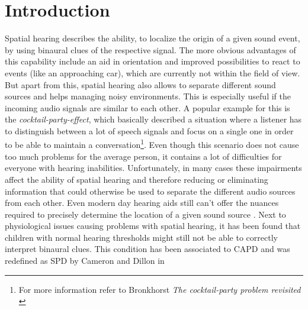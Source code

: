 \documentclass[a4paper,11pt]{article}%
\renewcommand{\\}{\vspace*{0.5\baselineskip} \newline}
\begin{document}
\newpage


\section{Introduction}
\label{sec:introduction}
Spatial hearing describes the ability, to localize the origin of a given sound event, by using binaural clues of the respective signal. The more obvious advantages of this capability include an aid in orientation and improved possibilities to react to events (like an approaching car), which are currently not within the field of view.
\newline
\newline
But apart from this, spatial hearing also allows to separate different sound sources and helps managing noisy environments. This is especially useful if the incoming audio signals are similar to each other. A popular example for this is the \textit{cocktail-party-effect}, which basically described a situation where a listener has to distinguish between a lot of speech signals and focus on a single one in order to be able to maintain a conversation\footnote{For more information refer to Bronkhorst \textit{The cocktail-party problem revisited} \cite{CP}}.
\newline
\newline
Even though this scenario does not cause too much problems for the average person, it contains a lot of difficulties for everyone with hearing inabilities. Unfortunately, in many cases these impairments affect the ability of spatial hearing and therefore reducing or eliminating information that could otherwise be used to separate the different audio sources from each other. Even modern day hearing aids still can't offer the nuances required to precisely determine the location of a given sound source \cite{HA-SRT}.
\newline
\newline
Next to physiological issues causing problems with spatial hearing, it has been found that children with normal hearing thresholds might still not be able to correctly interpret binaural clues. This condition has been associated to \ac{CAPD} and was redefined as \ac{SPD} by Cameron and Dillon in 
\end{document}
